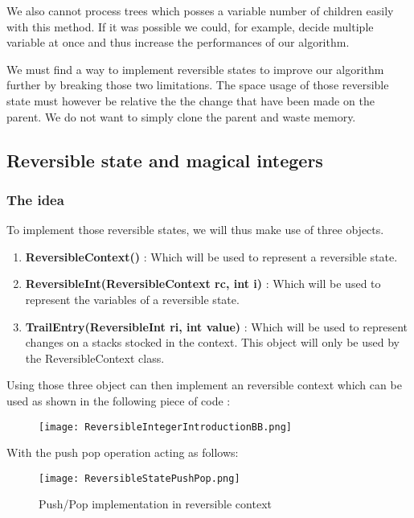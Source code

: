 We also cannot process trees which posses a variable number of children easily with this method. If it was possible we could, for example, decide multiple variable at once
and thus increase the performances of our algorithm. \newline

We must find a way to implement reversible states to improve our algorithm further
by breaking those two limitations. The space usage of those reversible state must however
be relative the the change that have been made on the parent. We do not want to simply
clone the parent and waste memory.

\subsection{Reversible state and magical integers}

\subsubsection{The idea}

To implement those reversible states, we will thus make use of three objects.

\begin{enumerate}
	\item \textbf{ReversibleContext()} : Which will be used to represent a 
	reversible state.
	\item \textbf{ReversibleInt(ReversibleContext rc, int i)} : Which will be used to 
	represent the variables of a reversible state.
	\item \textbf{TrailEntry(ReversibleInt ri, int value)} : Which will be used
	to represent changes on a stacks stocked in the context. This object will
	only be used by the ReversibleContext class.
\end{enumerate}

Using those three object can then implement an reversible context 
which can be used as shown in the following piece of code :

\begin{figure}[!ht]
    \centering
    \texttt{[image: ReversibleIntegerIntroductionBB.png]}
    \label{fig:Knapsack_example}
\end{figure}
\FloatBarrier

With the push pop operation acting as follows:

\begin{figure}[!ht]
    \centering
    \texttt{[image: ReversibleStatePushPop.png]}
    \caption{Push/Pop implementation in reversible context}
    \label{fig:Knapsack_example}
\end{figure}
\FloatBarrier

